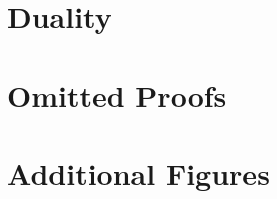\documentclass[12pt]{article}
\begin{document}
\clearpage



\clearpage
\appendix
% 

\section{Duality}\label{apx:duality}


\section{Omitted Proofs}\label{apx:omit}
\printproofs

\section{Additional Figures}\label{apx:extra}


% 
\end{document}
